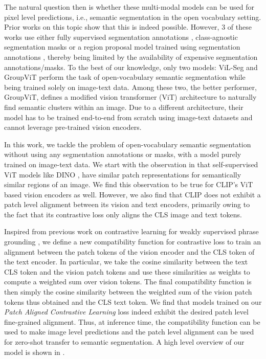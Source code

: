 \documentclass[10pt,twocolumn,letterpaper]{article}
\begin{document}
The natural question then is whether these multi-modal models can be used for pixel level predictions, i.e., semantic segmentation in the open vocabulary setting. Prior works on this topic \cite{li2022language, ghiasi2021open, xu2021simple, liu2022open, xu2022groupvit} show that this is indeed possible. However, 3 of these works use either fully supervised segmentation annotations \cite{liu2022open}, class-agnostic segmentation masks \cite{ghiasi2021open} or a region proposal model trained using segmentation annotations \cite{xu2021simple}, thereby being limited by the availability of expensive segmentation annotations/masks. To the best of our knowledge, only two models: ViL-Seg \cite{liu2022open} and GroupViT \cite{xu2022groupvit} perform the task of open-vocabulary semantic segmentation while being trained solely on image-text data. Among these two, the better performer, GroupViT, defines a modified vision transformer (ViT) \cite{dosovitskiy2020image} architecture to naturally find semantic clusters within an image. Due to a different architecture, their model has to be trained end-to-end from scratch using image-text datasets and cannot leverage pre-trained vision encoders.

In this work, we tackle the problem of open-vocabulary semantic segmentation without using any segmentation annotations or masks, with a model purely trained on image-text data. We start with the observation in \cite{hamilton2022unsupervised} that self-supervised ViT models like DINO \cite{caron2021emerging}, have similar patch representations for semantically similar regions of an image. We find this observation to be true for CLIP's ViT based vision encoders as well. However, we also find that CLIP does not exhibit a patch level alignment between its vision and text encoders, primarily owing to the fact that its contrastive loss only aligns the CLS image and text tokens.

Inspired from previous work on contrastive learning for weakly supervised phrase grounding \cite{gupta2020contrastive}, we define a new compatibility function for contrastive loss to train an alignment between the patch tokens of the vision encoder and the CLS token of the text encoder. In particular, we take the cosine similarity between the text CLS token and the vision patch tokens and use these similarities as weights to compute a weighted sum over vision tokens. The final compatibility function is then simply the cosine similarity between the weighted sum of the vision patch tokens thus obtained and the CLS text token. We find that models trained on our \emph{Patch Aligned Contrastive Learning} loss indeed exhibit the desired patch level fine-grained alignment. Thus, at inference time, the compatibility function can be used to make image level predictions and the patch level alignment can be used for zero-shot transfer to semantic segmentation. A high level overview of our model is shown in .
\end{document}
